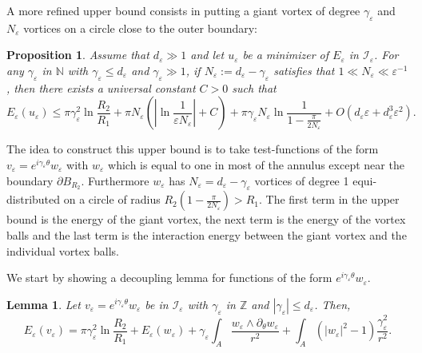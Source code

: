 \documentclass[12pt,reqno]{amsart}
\newtheorem{proposition}[theorem]{Proposition}
\newtheorem{lemma}[theorem]{Lemma}
\def\I{{\mathcal I}}
\def\e {{\varepsilon}}
\def \p {\partial}
\numberwithin{equation}{section}
\begin{document}
 A more refined upper bound consists in putting a giant vortex of degree $\gamma_\e$ and $N_\e$ vortices on a circle close to the outer boundary:
\begin{proposition}\label{prop:2nd_upper_bound}
Assume that \(d_\e \gg 1\) and let \(u_\e\) be a minimizer of \(E_\e\) in \(\I_\e\). For any \(\gamma_\e\) in \(\mathbb{N}\) with \(\gamma_\e\leq d_\e\) and \(\gamma_\e \gg 1\), if \(N_\e:=d_\e-\gamma_\e\) satisfies that \( 1 \ll N_\e \ll \e^{-1}\), then there exists a universal constant \(C>0\) such that
\begin{equation}\label{eq:upperbound}
E_\e(u_\e)\leq \pi \gamma_\e^2\ln \frac{R_2}{R_1}+\pi N_\e (|\ln \frac 1{\e N_\e}| +C)+\pi \gamma_\e N_\e
\ln \frac{1}{1-\frac {\pi}{2N_\e}}+ O(d_\e \e +d_\e^3 \e^2).
\end{equation}

\end{proposition}

The idea to construct this upper bound is to take test-functions of the form \(v_\e=e^{i\gamma_\e \theta} w_\e\) with \(w_\e\) which is equal to one in most of the annulus except near the boundary \(\p B_{R_2}\). Furthermore \(w_\e\) has \(N_\e=d_\e-\gamma_\e\) vortices of degree 1 equi-distributed on a circle of radius \(R_2(1-\frac{\pi}{2N_\e})>R_1\). The first term in the upper bound is the energy of the giant vortex, the next term is the energy of the vortex balls and the last term is the interaction energy between the giant vortex and the individual vortex balls.



We start by showing a decoupling lemma for functions of the form \(e^{i\gamma_\e \theta} w_\e\).

\begin{lemma}\label{lem:decoupling}
Let \(v_\e=e^{i\gamma_\e \theta} w_\e\) be in \(\I_\e\) with \(\gamma_\e\) in \( \mathbb{Z}\) and \(|\gamma_\e|\leq d_\e\). Then,
\begin{equation}\label{eq:decoupling}
E_\e(v_\e)=\pi \gamma_\e^2\ln \frac{R_2}{R_1}+E_\e(w_\e)+\gamma_\e \int_{A} \frac{w_\e\wedge \p_\theta w_\e}{r^2}+ \int_{A} (|w_\e|^2-1)\frac{\gamma_\e^2}{r^2}.
\end{equation}
\end{lemma}
\end{document}
